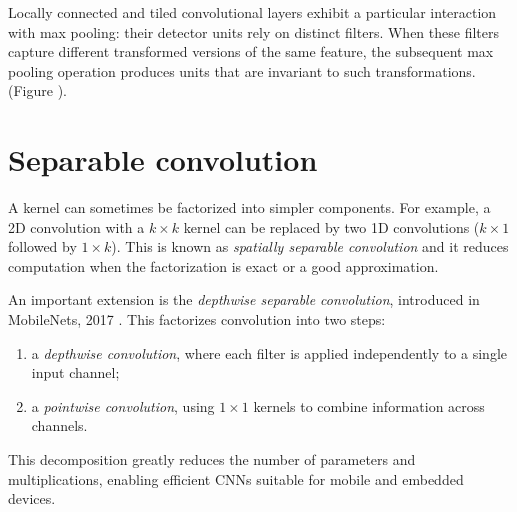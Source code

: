 Locally connected and tiled convolutional layers exhibit a particular interaction with max pooling: their detector units rely on distinct filters. When these filters capture different transformed versions of the same feature, the subsequent max pooling operation produces units that are invariant to such transformations. (Figure ).  

\section{Separable convolution}

A kernel can sometimes be factorized into simpler components.  
For example, a 2D convolution with a $k \times k$ kernel can be replaced by two 1D convolutions ($k \times 1$ followed by $1 \times k$).  
This is known as \textit{spatially separable convolution} and it reduces computation when the factorization is exact or a good approximation.  

\clearpage

An important extension is the \textit{depthwise separable convolution}, introduced in MobileNets, 2017 \cite{howard2017mobilenets}.  
This factorizes convolution into two steps:  
\begin{enumerate}
    \item a \textit{depthwise convolution}, where each filter is applied independently to a single input channel;  
    \item a \textit{pointwise convolution}, using $1 \times 1$ kernels to combine information across channels.  
\end{enumerate}
This decomposition greatly reduces the number of parameters and multiplications, enabling efficient CNNs suitable for mobile and embedded devices.